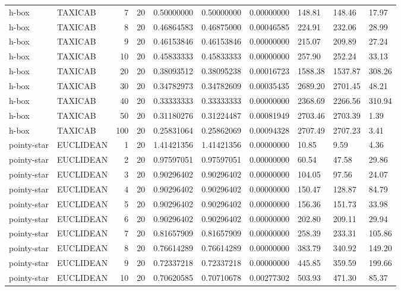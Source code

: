 \begin{longtable}{llrrllllll}
h-box & TAXICAB & 7 & 20 & 0.50000000 & 0.50000000 & 0.00000000 & 148.81 & 148.46 & 17.97 \\
h-box & TAXICAB & 8 & 20 & 0.46864583 & 0.46875000 & 0.00046585 & 224.91 & 232.06 & 28.99 \\
h-box & TAXICAB & 9 & 20 & 0.46153846 & 0.46153846 & 0.00000000 & 215.07 & 209.89 & 27.24 \\
h-box & TAXICAB & 10 & 20 & 0.45833333 & 0.45833333 & 0.00000000 & 257.90 & 252.24 & 33.13 \\
h-box & TAXICAB & 20 & 20 & 0.38093512 & 0.38095238 & 0.00016723 & 1588.38 & 1537.87 & 308.26 \\
h-box & TAXICAB & 30 & 20 & 0.34782973 & 0.34782609 & 0.00035435 & 2689.20 & 2701.45 & 48.21 \\
h-box & TAXICAB & 40 & 20 & 0.33333333 & 0.33333333 & 0.00000000 & 2368.69 & 2266.56 & 310.94 \\
h-box & TAXICAB & 50 & 20 & 0.31180276 & 0.31224487 & 0.00081949 & 2703.46 & 2703.39 & 1.39 \\
h-box & TAXICAB & 100 & 20 & 0.25831064 & 0.25862069 & 0.00094328 & 2707.49 & 2707.23 & 3.41 \\
pointy-star & EUCLIDEAN & 1 & 20 & 1.41421356 & 1.41421356 & 0.00000000 & 10.85 & 9.59 & 4.36 \\
pointy-star & EUCLIDEAN & 2 & 20 & 0.97597051 & 0.97597051 & 0.00000000 & 60.54 & 47.58 & 29.86 \\
pointy-star & EUCLIDEAN & 3 & 20 & 0.90296402 & 0.90296402 & 0.00000000 & 104.05 & 97.56 & 24.07 \\
pointy-star & EUCLIDEAN & 4 & 20 & 0.90296402 & 0.90296402 & 0.00000000 & 150.47 & 128.87 & 84.79 \\
pointy-star & EUCLIDEAN & 5 & 20 & 0.90296402 & 0.90296402 & 0.00000000 & 156.36 & 151.73 & 33.98 \\
pointy-star & EUCLIDEAN & 6 & 20 & 0.90296402 & 0.90296402 & 0.00000000 & 202.80 & 209.11 & 29.94 \\
pointy-star & EUCLIDEAN & 7 & 20 & 0.81657909 & 0.81657909 & 0.00000000 & 258.39 & 233.31 & 105.86 \\
pointy-star & EUCLIDEAN & 8 & 20 & 0.76614289 & 0.76614289 & 0.00000000 & 383.79 & 340.92 & 149.20 \\
pointy-star & EUCLIDEAN & 9 & 20 & 0.72337218 & 0.72337218 & 0.00000000 & 445.85 & 359.59 & 199.66 \\
pointy-star & EUCLIDEAN & 10 & 20 & 0.70620585 & 0.70710678 & 0.00277302 & 503.93 & 471.30 & 85.37 \\

\end{longtable}
